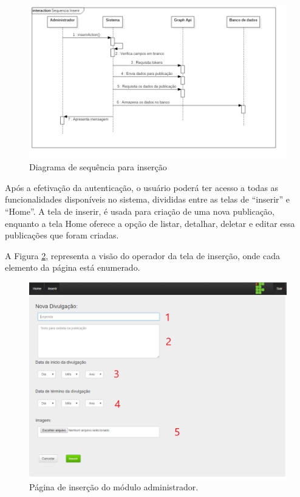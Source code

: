  \begin{figure}[H]
\centering
\includegraphics[scale=0.4]{figuras/sequenciainserir}
\caption{Diagrama de sequência para inserção}
\label{fig:sequenciainserir}
\end{figure}

Após a efetivação da autenticação, o usuário poderá ter acesso a todas as funcionalidades disponíveis no sistema, divididas entre as telas de ``inserir'' e ``Home''. A tela de inserir, é usada para criação de uma nova publicação, enquanto a tela Home oferece a opção de listar, detalhar, deletar e editar essa publicações que foram criadas.

A Figura \ref{fig:administrador1}, representa a visão do operador da tela de inserção, onde cada elemento da página está enumerado.

\begin{figure}[H]
\centering
\includegraphics[scale=0.4]{figuras/administrador1}
\caption{Página de inserção do módulo administrador.}
\label{fig:administrador1}
\end{figure}

